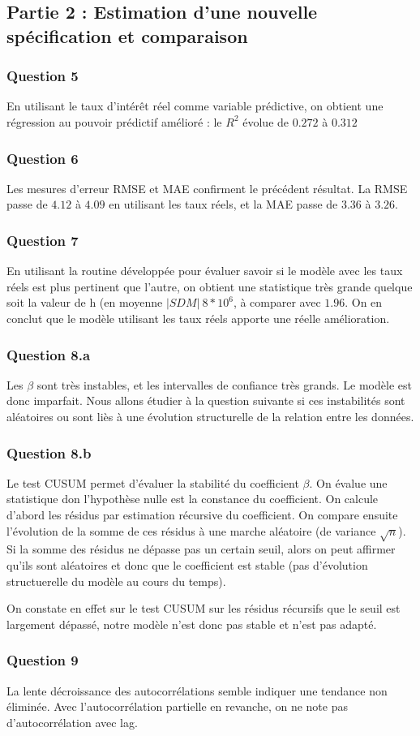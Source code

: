 \documentclass[a4paper,12pt]{article}
\begin{document}
\subsection*{Partie 2 : Estimation d'une nouvelle spécification et comparaison}
\subsubsection*{Question 5}
En utilisant le taux d'intérêt réel comme variable prédictive, on obtient une régression au pouvoir prédictif amélioré : le $R^2$ évolue de $0.272$ à $0.312$

\subsubsection*{Question 6}
Les mesures d'erreur RMSE et MAE confirment le précédent résultat. La RMSE passe de $4.12$ à $4.09$ en utilisant les taux réels, et la MAE passe de $3.36$ à $3.26$.

\subsubsection*{Question 7}
En utilisant la routine développée pour évaluer savoir si le modèle avec les taux réels est plus pertinent que l'autre, on obtient une statistique très grande quelque soit la valeur de h (en moyenne $|SDM| ~
8*10^6$, à comparer avec $1.96$. On en conclut que le modèle utilisant les taux réels apporte une réelle amélioration.

\subsubsection*{Question 8.a}
Les $\beta$ sont très instables, et les intervalles de confiance très grands.
Le modèle est donc imparfait. Nous allons étudier à la question suivante si ces instabilités sont aléatoires ou sont liès à une évolution structurelle de la relation entre les données.

\subsubsection*{Question 8.b}
Le test CUSUM permet d'évaluer la stabilité du coefficient $\beta$.
On évalue une statistique don l'hypothèse nulle est la constance du coefficient.
On calcule d'abord les résidus par estimation récursive du coefficient.
On compare ensuite l'évolution de la somme de ces résidus à une marche aléatoire (de variance $\sqrt{n}$).
Si la somme des résidus ne dépasse pas un certain seuil, alors on peut affirmer qu'ils sont aléatoires et donc que le coefficient est stable (pas d'évolution structuerelle du modèle au cours du temps).

On constate en effet sur le test CUSUM sur les résidus récursifs que le seuil est largement dépassé, notre modèle n'est donc pas stable et n'est pas adapté.


\subsubsection*{Question 9}
La lente décroissance des autocorrélations semble indiquer une tendance non éliminée.
Avec l'autocorrélation partielle en revanche, on ne note pas d'autocorrélation avec lag.
\end{document}
